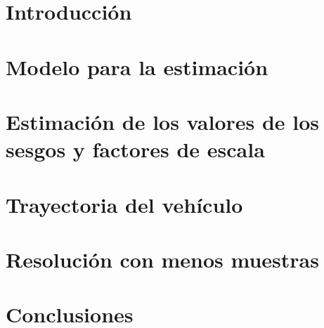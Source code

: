 \documentclass[10pt,a4paper]{article}
\begin{document}
		
	\setcounter{page}{1}

	\section{Introducción}\label{sec:intro}
		
		
	\section{Modelo para la estimación}\label{sec:modelo}
		

	\section{Estimación de los valores de los sesgos y factores de escala}\label{sec:estim}
                

	\section{Trayectoria del vehículo}\label{sec:tray}
		

	\section{Resolución con menos muestras}\label{sec:alternativa}
		
                
	\section{Conclusiones}
		
	
\end{document}
